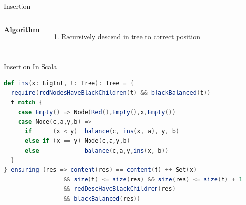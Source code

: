 \begin{frame}{Insertion}
\begin{columns}[T]
\textbf{Algorithm}
\begin{enumerate}
  \item Recursively descend in tree to correct position
\end{enumerate}

\centering
{}
\end{columns}
\end{frame}

\begin{frame}[fragile]{Insertion}
In Scala
\begin{lstlisting}[language=Scala, basicstyle=\footnotesize\ttfamily,]
def ins(x: BigInt, t: Tree): Tree = {
  require(redNodesHaveBlackChildren(t) && blackBalanced(t))
  t match {
    case Empty() => Node(Red(),Empty(),x,Empty())
    case Node(c,a,y,b) =>
      if      (x < y)  balance(c, ins(x, a), y, b)
      else if (x == y) Node(c,a,y,b)
      else             balance(c,a,y,ins(x, b))
  }
} ensuring (res => content(res) == content(t) ++ Set(x)
                 && size(t) <= size(res) && size(res) <= size(t) + 1
                 && redDescHaveBlackChildren(res)
                 && blackBalanced(res))
\end{lstlisting}
\end{frame}

